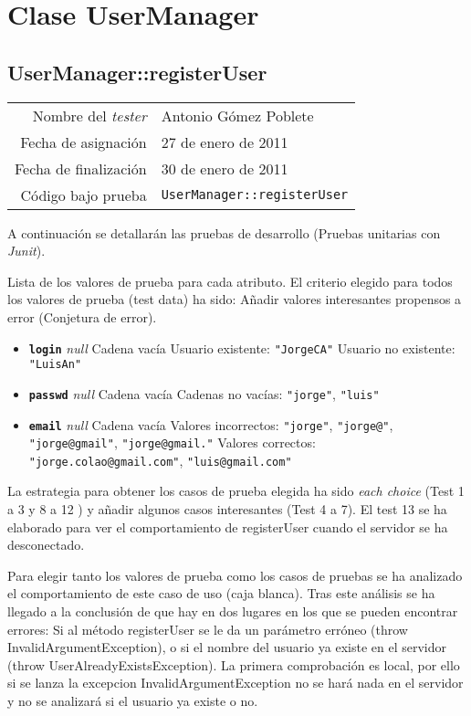 \section{Clase UserManager}

\subsection{UserManager::registerUser}

{\small
\begin{tabular}{r|l}
Nombre del \textit{tester} & Antonio Gómez Poblete \\
Fecha de asignación & 27 de enero de 2011 \\
Fecha de finalización & 30 de enero de 2011 \\
Código bajo prueba & \texttt{UserManager::registerUser}
\end{tabular}
}

A continuación se detallarán las pruebas de desarrollo (Pruebas unitarias con \textit{Junit}).

Lista de los valores de prueba para cada atributo.
El criterio elegido para todos los valores de prueba (test data) ha sido: Añadir valores interesantes propensos a error (Conjetura de error).

\begin{itemize}
\item \textbf{\texttt{login}}
\subitem \textit{null}
\subitem Cadena vacía
\subitem Usuario existente: \texttt{"JorgeCA"}
\subitem Usuario no existente: \texttt{"LuisAn"}

\item \textbf{\texttt{passwd}}
\subitem \textit{null}
\subitem Cadena vacía
\subitem Cadenas no vacías: \texttt{"jorge"}, \texttt{"luis"}

\item \textbf{\texttt{email}}
\subitem \textit{null}
\subitem Cadena vacía
\subitem Valores incorrectos: \texttt{"jorge"}, \texttt{"jorge@"}, \texttt{"jorge@gmail"}, \texttt{"jorge@gmail."}
\subitem Valores correctos: \texttt{"jorge.colao@gmail.com"}, \texttt{"luis@gmail.com"}
\end{itemize}

La estrategia para obtener los casos de prueba elegida ha sido
\textit{each choice} (Test 1 a 3 y 8 a 12 ) y añadir algunos casos
interesantes (Test 4 a 7).
El test 13 se ha elaborado para ver el comportamiento de registerUser cuando el servidor se ha desconectado.

Para elegir tanto los valores de prueba como los casos de pruebas se ha analizado el comportamiento de este caso de uso (caja blanca). Tras este análisis se ha llegado a la conclusión de que hay en dos lugares en los que se pueden encontrar errores: Si al método registerUser se le da un parámetro erróneo (throw InvalidArgumentException), o si el nombre del usuario ya existe en el servidor (throw UserAlreadyExistsException). La primera comprobación es local, por ello si se lanza la excepcion InvalidArgumentException no se hará nada en el servidor y no se analizará si el usuario ya existe o no.

